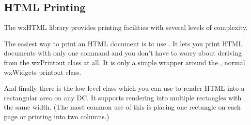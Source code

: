 \subsection{HTML Printing}\label{printing}

The wxHTML library provides printing facilities with several levels of complexity. 

The easiest way to print an HTML document is to use 
. It lets you print HTML documents with only one
command and you don't have to worry about deriving from the wxPrintout class at all. It is only a simple wrapper around the 
, normal wxWidgets printout class.

And finally there is the low level class  which you can use to
render HTML into a rectangular area on any DC. It supports rendering into multiple rectangles with the same
width. (The most common use of this is placing one rectangle on each page or printing into two columns.)

